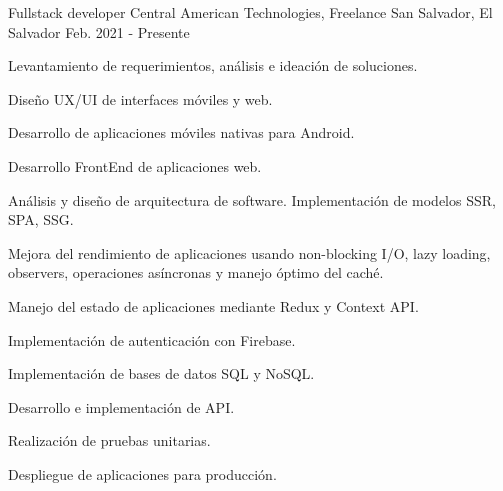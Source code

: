 

\begin{cventries}

  \cventry
    {Fullstack developer} %
    {Central American Technologies, Freelance} %
    {San Salvador, El Salvador} %
    {Feb. 2021 - Presente} %
    {
      \begin{cvitems} %
        \item {Levantamiento de requerimientos, análisis e ideación de soluciones.}
        \item {Diseño UX/UI de interfaces móviles y web.}
        \item {Desarrollo de aplicaciones móviles nativas para Android.}
        \item {Desarrollo FrontEnd de aplicaciones web.}
        \item {Análisis y diseño de arquitectura de software. Implementación de modelos SSR, SPA, SSG.}
        \item {Mejora del rendimiento de aplicaciones usando non-blocking I/O, lazy loading, observers, operaciones asíncronas y manejo óptimo del caché.}
        \item {Manejo del estado de aplicaciones mediante Redux y Context API.}
        \item {Implementación de autenticación con Firebase.}
        \item {Implementación de bases de datos SQL y NoSQL.}
        \item {Desarrollo e implementación de API.}
        \item {Realización de pruebas unitarias.}
        \item {Despliegue de aplicaciones para producción.}
      \end{cvitems}
    }


\end{cventries}
